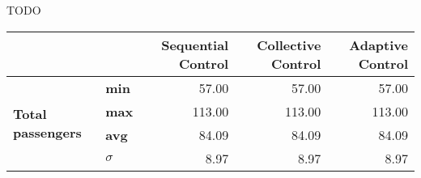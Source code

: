 TODO

\begingroup
\renewcommand*{\arraystretch}{1.0}
\begin{table}[]
\centering
\begin{tabular}{llrrr}
                                      &     & \begin{minipage}{2cm}\textbf{Sequential Control} \vspace{1em}\end{minipage} & \begin{minipage}{2cm}\textbf{Collective Control} \vspace{1em}\end{minipage} & \begin{minipage}{2cm}\textbf{Adaptive Control} \vspace{1em}\end{minipage}\\ \hline
\multirow{4}{*}{\textbf{Total passengers}}     & \textbf{min}        & 57.00                                                                                                                                             & 57.00                                                                                                                                             & 57.00                                                                                                                                           \\
                                               & \textbf{max}        & 113.00                                                                                                                                            & 113.00                                                                                                                                            & 113.00                                                                                                                                          \\
                                               & \textbf{avg}        & 84.09                                                                                                                                             & 84.09                                                                                                                                             & 84.09                                                                                                                                           \\
                                               & \textbf{$ \sigma $} & 8.97                                                                                                                                              & 8.97                                                                                                                                              & 8.97                                                                                                                                            \\ \hline

\end{tabular}
\end{table}
